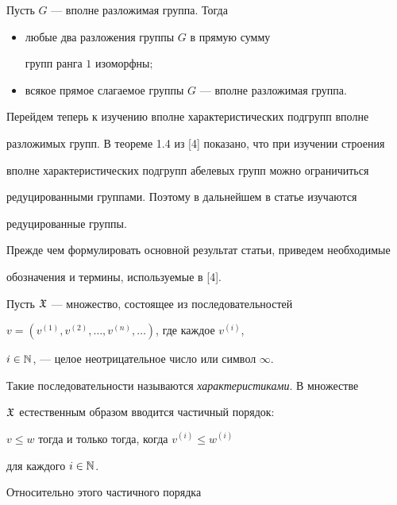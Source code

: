 \begin{prop}


Пусть $G$ --- вполне разложимая группа. Тогда


\begin{itemize}


\item[1)] любые два разложения группы $G$ в прямую сумму 


групп ранга $1$ изоморфны$;$


\item[2)] всякое прямое слагаемое группы $G$ --- вполне разложимая группа.


\end{itemize}


\end{prop}





Перейдем теперь к изучению вполне характеристических подгрупп вполне


разложимых групп. В теореме 1.4 из [4] показано, что при изучении строения


вполне характеристических подгрупп абелевых групп можно ограничиться


редуцированными группами. Поэтому в дальнейшем в статье изучаются


редуцированные группы.





Прежде чем формулировать основной результат статьи, приведем необходимые


обозначения и термины, используемые в [4].





Пусть $\frak X$ --- множество, состоящее из последовательностей


$v=(v^{(1)}, v^{(2)},\dotsc,v^{(n)},\dotsc )$, где каждое $v^{(i)}$,


$i\in\Bbb N$, --- целое неотрицательное число или символ $\infty$.


Такие последовательности называются {\em характеристиками}. В множестве


$\frak X$ естественным образом вводится частичный порядок:


$v\leqslant w$ тогда и только тогда, когда $v^{(i)}\leqslant w^{(i)}$


для каждого $i\in\Bbb N$.


Относительно этого частичного порядка


